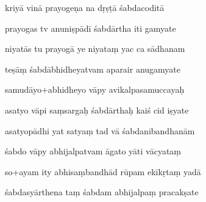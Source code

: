 \documentclass[article,12pt,a4paper]{memoir}%
\newcounter{parCount}
\begin{document}
	  
	  \pstart {} kriyā vinā prayogeṇa na dṛṣṭā śabdacoditā 
	{}
	\pend%
      

	  
	  \pstart \leavevmode%
	prayogas tv anuniṣpādī śabdārtha iti gamyate 
	{}
	\pend%
      

	  
	  \pstart {} niyatās tu prayogā ye niyataṃ yac ca sādhanam 
	{}
	\pend%
      

	  
	  \pstart \leavevmode%
	teṣāṃ śabdābhidheyatvam aparair anugamyate 
	{}
	\pend%
      

	  
	  \pstart {} samudāyo+abhidheyo vāpy avikalpasamuccayaḥ 
	{}
	\pend%
      

	  
	  \pstart \leavevmode%
	asatyo vāpi saṃsargaḥ śabdārthaḥ kaiś cid iṣyate 
	{}
	\pend%
      

	  
	  \pstart {} asatyopādhi yat satyaṃ tad vā śabdanibandhanām 
	{}
	\pend%
      

	  
	  \pstart \leavevmode%
	śabdo vāpy abhijalpatvam āgato yāti vācyataṃ 
	{}
	\pend%
      

	  
	  \pstart {} so+ayam ity abhisaṃbandhād rūpam ekīkṛtaṃ yadā 
	{}
	\pend%
      

	  
	  \pstart \leavevmode%
	śabdasyārthena taṃ śabdam abhijalpaṃ pracakṣate 
	{}
	\pend%
      
\end{document}
